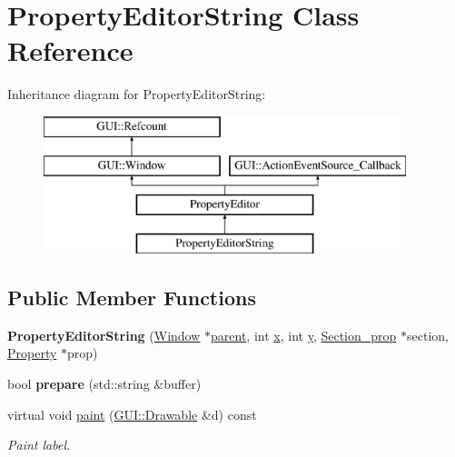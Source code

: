 \hypertarget{classPropertyEditorString}{\section{Property\-Editor\-String Class Reference}
\label{classPropertyEditorString}
}
Inheritance diagram for Property\-Editor\-String\-:\begin{figure}[H]
\begin{center}
\leavevmode
\includegraphics[height=4.000000cm]{classPropertyEditorString}
\end{center}
\end{figure}
\subsection*{Public Member Functions}
\begin{DoxyCompactItemize}
\item 
\hypertarget{classPropertyEditorString_a31b0d946bf3f3266c7c99db8c74e72c2}{{\bfseries Property\-Editor\-String} (\hyperlink{classGUI_1_1Window_ae828e9daa964dfc65a3550fb03117d30}{Window} $\ast$\hyperlink{classGUI_1_1Window_a2e593ff65e7702178d82fe9010a0b539}{parent}, int \hyperlink{classGUI_1_1Window_a6ca6a80ca00c9e1d8ceea8d3d99a657d}{x}, int \hyperlink{classGUI_1_1Window_a0ee8e923aff2c3661fc2e17656d37adf}{y}, \hyperlink{classSection__prop}{Section\-\_\-prop} $\ast$section, \hyperlink{classProperty}{Property} $\ast$prop)}\label{classPropertyEditorString_a31b0d946bf3f3266c7c99db8c74e72c2}

\item 
\hypertarget{classPropertyEditorString_a4653327f5d42f8b8146ecad5d1c9a53e}{bool {\bfseries prepare} (std\-::string \&buffer)}\label{classPropertyEditorString_a4653327f5d42f8b8146ecad5d1c9a53e}

\item 
\hypertarget{classPropertyEditorString_a0028ea9754fc3698d84531ae0fd042fd}{virtual void \hyperlink{classPropertyEditorString_a0028ea9754fc3698d84531ae0fd042fd}{paint} (\hyperlink{classGUI_1_1Drawable}{G\-U\-I\-::\-Drawable} \&d) const }\label{classPropertyEditorString_a0028ea9754fc3698d84531ae0fd042fd}

\begin{DoxyCompactList}\small\item\em Paint label. \end{DoxyCompactList}\end{DoxyCompactItemize}
